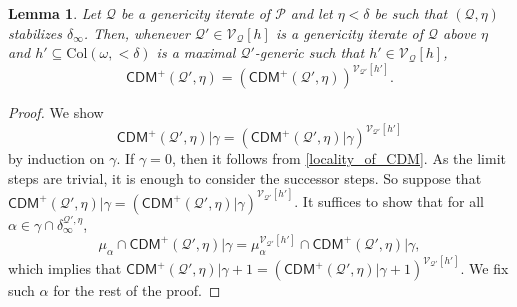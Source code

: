 \documentclass{amsart}
\newtheorem{lem}[dfn]{Lemma}
\renewcommand{\subset}{\subseteq}
\begin{document}
\begin{lem}\label{locality_of_CDM_plus}
    Let $\mathcal{Q}$ be a genericity iterate of $\mathcal{P}$ and let $\eta<\delta$ be such that $(\mathcal{Q}, \eta)$ stabilizes $\delta_{\infty}$.
    Then, whenever $\mathcal{Q}'\in\mathcal{V}_{\mathcal{Q}}[h]$ is a genericity iterate of $\mathcal{Q}$ above $\eta$ and $h'\subset\mathrm{Col}(\omega, {<}\delta)$ is a maximal $\mathcal{Q}'$-generic such that $h'\in\mathcal{V}_{\mathcal{Q}}[h]$,
    \[
    \mathsf{CDM}^+(\mathcal{Q}', \eta)=(\mathsf{CDM}^+(\mathcal{Q}', \eta))^{\mathcal{V}_{\mathcal{Q}'}[h']}.
    \]
\end{lem}
\begin{proof}
    We show 
    \[
    \mathsf{CDM}^+(\mathcal{Q}', \eta)\vert\gamma=(\mathsf{CDM}^+(\mathcal{Q}', \eta)\vert\gamma)^{\mathcal{V}_{\mathcal{Q}'}[h']}
    \]
    by induction on $\gamma$.
    If $\gamma=0$, then it follows from \cref{locality_of_CDM}.
    As the limit steps are trivial, it is enough to consider the successor steps.
    So suppose that $\mathsf{CDM}^+(\mathcal{Q}', \eta)\vert\gamma=(\mathsf{CDM}^+(\mathcal{Q}', \eta)\vert\gamma)^{\mathcal{V}_{\mathcal{Q}'}[h']}$.
    It suffices to show that for all $\alpha\in\gamma\cap\delta^{\mathcal{Q}', \eta}_{\infty}$,
    \[
    \mu_{\alpha}\cap\mathsf{CDM}^+(\mathcal{Q}', \eta)\vert\gamma=\mu_{\alpha}^{\mathcal{V}_{\mathcal{Q}'}[h']}\cap\mathsf{CDM}^+(\mathcal{Q}', \eta)\vert\gamma,
    \]
    which implies that $\mathsf{CDM}^+(\mathcal{Q}', \eta)\vert\gamma+1=(\mathsf{CDM}^+(\mathcal{Q}', \eta)\vert\gamma+1)^{\mathcal{V}_{\mathcal{Q}'}[h']}$.
    We fix such $\alpha$ for the rest of the proof.
    

\end{proof}
\end{document}
